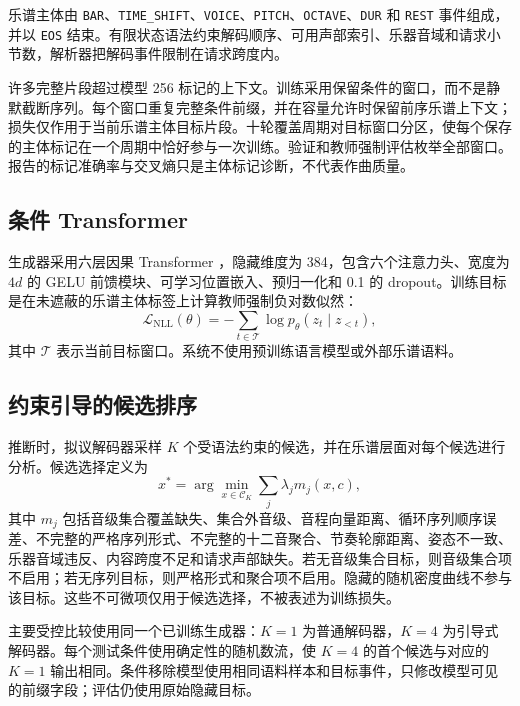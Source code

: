 乐谱主体由 \texttt{BAR}、\texttt{TIME\_SHIFT}、\texttt{VOICE}、\texttt{PITCH}、\texttt{OCTAVE}、\texttt{DUR} 和 \texttt{REST} 事件组成，并以 \texttt{EOS} 结束。有限状态语法约束解码顺序、可用声部索引、乐器音域和请求小节数，解析器把解码事件限制在请求跨度内。

许多完整片段超过模型 256 标记的上下文。训练采用保留条件的窗口，而不是静默截断序列。每个窗口重复完整条件前缀，并在容量允许时保留前序乐谱上下文；损失仅作用于当前乐谱主体目标片段。十轮覆盖周期对目标窗口分区，使每个保存的主体标记在一个周期中恰好参与一次训练。验证和教师强制评估枚举全部窗口。报告的标记准确率与交叉熵只是主体标记诊断，不代表作曲质量。

\subsection{条件 Transformer}

生成器采用六层因果 Transformer \citep{vaswani2017attention}，隐藏维度为 384，包含六个注意力头、宽度为 $4d$ 的 GELU 前馈模块、可学习位置嵌入、预归一化和 0.1 的 dropout。训练目标是在未遮蔽的乐谱主体标签上计算教师强制负对数似然：
\begin{equation}
  \mathcal{L}_{\mathrm{NLL}}(\theta)
  =-\sum_{t\in\mathcal{T}}\log p_\theta(z_t\mid z_{<t}),
  \label{eq:nll-zh}
\end{equation}
其中 $\mathcal{T}$ 表示当前目标窗口。系统不使用预训练语言模型或外部乐谱语料。

\subsection{约束引导的候选排序}

推断时，拟议解码器采样 $K$ 个受语法约束的候选，并在乐谱层面对每个候选进行分析。候选选择定义为
\begin{equation}
  x^*=\arg\min_{x\in\mathcal{C}_K}\sum_j\lambda_j m_j(x,c),
  \label{eq:reranking-zh}
\end{equation}
其中 $m_j$ 包括音级集合覆盖缺失、集合外音级、音程向量距离、循环序列顺序误差、不完整的严格序列形式、不完整的十二音聚合、节奏轮廓距离、姿态不一致、乐器音域违反、内容跨度不足和请求声部缺失。若无音级集合目标，则音级集合项不启用；若无序列目标，则严格形式和聚合项不启用。隐藏的随机密度曲线不参与该目标。这些不可微项仅用于候选选择，不被表述为训练损失。

主要受控比较使用同一个已训练生成器：$K=1$ 为普通解码器，$K=4$ 为引导式解码器。每个测试条件使用确定性的随机数流，使 $K=4$ 的首个候选与对应的 $K=1$ 输出相同。条件移除模型使用相同语料样本和目标事件，只修改模型可见的前缀字段；评估仍使用原始隐藏目标。

